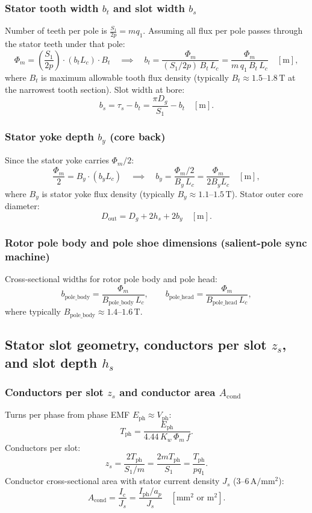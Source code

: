 \subsubsection{Stator tooth width $b_t$ and slot width $b_s$}
Number of teeth per pole is $\frac{S_1}{2p} = m q_1$.
Assuming all flux per pole passes through the stator teeth under that pole:
\[
\Phi_m = \left(\frac{S_1}{2p}\right)\cdot (b_t L_c)\cdot B_t
\quad\implies\quad
\boxed{b_t = \frac{\Phi_m}{(S_1/2p)\,B_t\,L_c} = \frac{\Phi_m}{m\,q_1\,B_t\,L_c}}\quad[\mathrm{m}],
\]
where $B_t$ is maximum allowable tooth flux density (typically $B_t \approx 1.5\text{--}1.8\,\mathrm{T}$ at the narrowest tooth section).
Slot width at bore:
\[
\boxed{b_s = \tau_s - b_t = \frac{\pi D_g}{S_1} - b_t}\quad[\mathrm{m}].
\]

\subsubsection{Stator yoke depth $b_y$ (core back)}
Since the stator yoke carries $\Phi_m/2$:
\[
\frac{\Phi_m}{2} = B_y\cdot(b_y L_c)
\quad\implies\quad
\boxed{b_y = \frac{\Phi_m/2}{B_y\,L_c} = \frac{\Phi_m}{2 B_y L_c}}\quad[\mathrm{m}],
\]
where $B_y$ is stator yoke flux density (typically $B_y \approx 1.1\text{--}1.5\,\mathrm{T}$).
Stator outer core diameter:
\[
\boxed{D_{\mathrm{out}} = D_g + 2 h_s + 2 b_y}\quad[\mathrm{m}].
\]

\subsubsection{Rotor pole body and pole shoe dimensions (salient-pole sync machine)}
Cross-sectional widths for rotor pole body and pole head:
\[
\boxed{b_{\mathrm{pole\_body}} = \frac{\Phi_m}{B_{\mathrm{pole\_body}}\,L_c}},
\qquad
\boxed{b_{\mathrm{pole\_head}} = \frac{\Phi_m}{B_{\mathrm{pole\_head}}\,L_c}},
\]
where typically $B_{\mathrm{pole\_body}} \approx 1.4\text{--}1.6\,\mathrm{T}$.

\subsection{Stator slot geometry, conductors per slot $z_s$, and slot depth $h_s$}
\subsubsection{Conductors per slot $z_s$ and conductor area $A_{\mathrm{cond}}$}
Turns per phase from phase EMF $E_{\mathrm{ph}} \approx V_{\mathrm{ph}}$:
\[
T_{\mathrm{ph}} = \frac{E_{\mathrm{ph}}}{4.44\,K_w\,\Phi_m\,f}.
\]
Conductors per slot:
\[
\boxed{z_s = \frac{2 T_{\mathrm{ph}}}{S_1/m} = \frac{2 m T_{\mathrm{ph}}}{S_1} = \frac{T_{\mathrm{ph}}}{p q_1}}.
\]
Conductor cross-sectional area with stator current density $J_s$ ($3\text{--}6\,\mathrm{A/mm^2}$):
\[
\boxed{A_{\mathrm{cond}} = \frac{I_c}{J_s} = \frac{I_{\mathrm{ph}}/a_p}{J_s}}\quad[\mathrm{mm^2}\text{ or }\mathrm{m^2}].
\]

